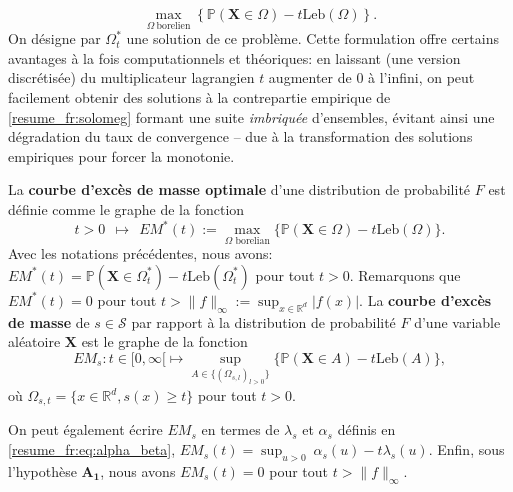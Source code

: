 \documentclass[a4paper, 12pt]{article}
\def\mb{\mathbf}
\def\rset{\mathbb{R}}
\def\leb{\text{Leb}}
\begin{document}
\begin{equation}
\label{resume_fr:solomeg}
\max_{\Omega~ \text{borelien}}  \left\{ \mathbb{P}(\mb X \in \Omega) - t \leb(\Omega) \right\}.
\end{equation}
On désigne par $ \Omega ^ * _ t $ une solution de ce problème. Cette formulation offre certains avantages à la fois computationnels et théoriques: en laissant (une version discrétisée) du multiplicateur lagrangien $ t $ augmenter de $ 0 $ à l'infini, on peut facilement obtenir des solutions à la contrepartie empirique de \eqref{resume_fr:solomeg} formant une suite \textit {imbriquée} d'ensembles, évitant ainsi une dégradation du taux de convergence -- due à la transformation des solutions empiriques pour forcer la monotonie.

%
La \textbf{courbe d'excès de masse optimale} d'une distribution de probabilité  $F$ est définie comme le graphe de la fonction
$$t>0~~\mapsto~~ EM^*(t):=\max_{\Omega\text{ borelian} } \{ {\mathbb{P}} (\mb X\in \Omega)-t\leb(\Omega) \}.$$ 
Avec les notations précédentes, nous avons: $EM^*(t)=\mathbb{P}(\mb X \in \Omega_t^*)-t \leb(\Omega_t^*)$ pour tout $t>0$.
Remarquons que $EM^*(t) = 0$ pour tout $t>\|f\|_\infty:=\sup_{x\in \rset^d}\vert f(x)\vert$. 
%
  La \textbf{courbe d'excès de masse} de $s\in\mathcal{S}$ par rapport à la distribution de probabilité $F$ d'une variable aléatoire $\mb X$ est le graphe de la fonction
\begin{equation}
\label{resume_fr:EM}
EM_s : t \in [0, \infty[ \mapsto \sup_{A \in \{(\Omega_{s,l})_{l>0}\}}\{ {\mathbb{P}}(\mb X \in A) - t \leb(A)\},
\end{equation}
où $\Omega_{s,t}=\{ x \in \rset^d, s(x) \ge t \}$ pour tout $t>0$.

On peut également écrire $ EM_s $ en termes de $ \lambda_s $ et $ \alpha_s $ définis en \eqref{resume_fr:eq:alpha_beta}, $EM_s(t)= \sup_{u>0}~ \alpha_s(u) -t \lambda_s(u) $. Enfin, sous l'hypothèse $ \mathbf {A_1} $, nous avons $ EM_s (t) = 0 $ pour tout $t> \|f\|_\infty$.
\end{document}
